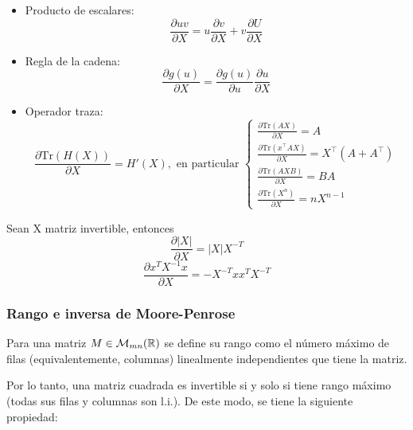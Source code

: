 \begin{itemize}
	\item Producto de escalares:
	\begin{equation}
		\frac{\partial uv}{\partial X} = u\frac{\partial v}{\partial X} + v\frac{\partial U}{\partial X}
	\end{equation}
	
	\item Regla de la cadena:
	\begin{equation}
		\frac{\partial g(u)}{\partial X} = \frac{\partial g(u)}{\partial u} \frac{\partial u}{\partial X}
	\end{equation}
	
	\item Operador traza:
	\begin{equation}
		\frac{\partial \text{Tr}(H(X))}{\partial X} = H'(X),	\text{ en particular } \begin{cases}
			\frac{\partial \text{Tr}(AX)}{\partial X} = A\\
			\frac{\partial \text{Tr}(x^\top A X)}{\partial X} = X^\top(A+A^\top)\\
			\frac{\partial \text{Tr}(AXB)}{\partial X} = BA\\
			\frac{\partial \text{Tr}(X^n)}{\partial X} = nX^{n-1}
		\end{cases}
		\end{equation}
\end{itemize}

Sean X matriz invertible, entonces 
\begin{equation}
\frac{\partial |X|}{\partial X} = |X|X^{-T} 
\end{equation}
\begin{equation}
\frac{\partial x^T X^{-1} x }{\partial X} = -X^{-T}xx^TX^{-T}
\end{equation}

\subsubsection{Rango e inversa de Moore-Penrose}

\begin{definition}[rango]
	Para una matriz $M\in\mathcal{M}_{mn}(\mathbb{R})$ se define su rango como el número máximo de filas (equivalentemente, columnas) linealmente independientes que tiene la matriz.
\end{definition}

Por lo tanto, una matriz cuadrada es invertible si y solo si tiene rango máximo (todas sus filas y columnas son l.i.). De este modo, se tiene la siguiente propiedad:

